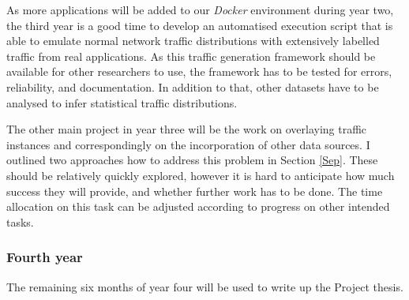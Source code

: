 \documentclass[a4paper,12pt,twoside]{report}
\begin{document}
As more applications will be added to our \textit{Docker} environment during year two, the third year is a good time to develop an automatised execution script that is able to emulate normal network traffic distributions with extensively labelled traffic from real applications. As this traffic generation framework should be available for other researchers to use, the framework has to be tested for errors, reliability, and documentation. In addition to that, other datasets have to be analysed to infer statistical traffic distributions. 

The other main project in year three will be the work on overlaying traffic instances and correspondingly on the incorporation of other data sources. I outlined two approaches how to address this problem in Section \ref{Sep}. These should be relatively quickly explored, however it is hard to anticipate how much success they will provide, and whether further work has to be done. The time allocation on this task can be adjusted according to progress on other intended tasks.

\subsubsection{Fourth year}

The remaining six months of year four will be used to write up the Project thesis. 









\end{document}
